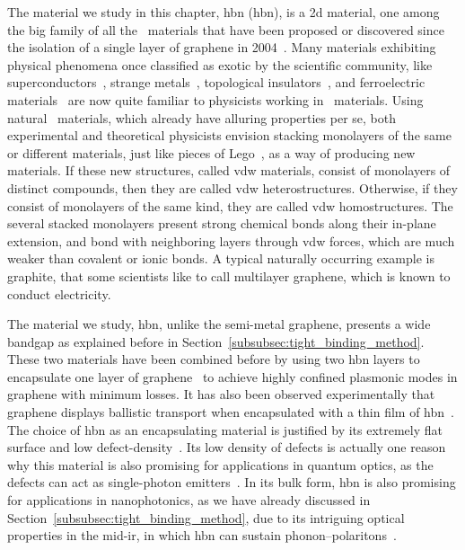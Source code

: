 The material we study in this chapter, \acrlong{hbn} (\gls{hbn}), is a \gls{2d} material, one among the big family of all the \bd~materials that have been proposed or discovered since the isolation of a single layer of graphene in 2004~\cite{Novoselov_Geim_2004}.
Many materials exhibiting physical phenomena once classified as exotic by the scientific community, like superconductors~\cite{Dong_2021}, strange metals~\cite{Li_2024}, topological insulators~\cite{Zhang_Liu_Qi_Dai_Fang_Zhang_2009}, and ferroelectric materials~\cite{Wang_Meng_2023} are now quite familiar to physicists working in \bd~materials.
Using natural \bd~materials, which already have alluring properties per se, both experimental and theoretical physicists envision stacking monolayers of the same or different materials, just like pieces of Lego~\cite{Dielectric_Genome}, as a way of producing new materials.
If these new structures, called \gls{vdw} materials, consist of monolayers of distinct compounds, then they are called \gls{vdw} heterostructures.
Otherwise, if they consist of monolayers of the same kind, they are called \gls{vdw} homostructures.
The several stacked monolayers present strong chemical bonds along their in-plane extension, and bond with neighboring layers through \gls{vdw} forces, which are much weaker than covalent or ionic bonds.
A typical naturally occurring example is graphite, that some scientists like to call multilayer graphene, which is known to conduct electricity.

The material we study, \gls{hbn}, unlike the semi-metal graphene, presents a wide bandgap as explained before in Section~\ref{subsubsec:tight_binding_method}.
These two materials have been combined before by using two \gls{hbn} layers to encapsulate one layer of graphene~\cite{Woessner_2015} to achieve highly confined plasmonic modes in graphene with minimum losses.
It has also been observed experimentally that graphene displays ballistic transport when encapsulated with a thin film of \gls{hbn}~\cite{Banszerus_2016}.
The choice of \gls{hbn} as an encapsulating material is justified by its extremely flat surface and low defect-density~\cite{Abidi_2019}.
Its low density of defects is actually one reason why this material is also promising for applications in quantum optics, as the defects can act as single-photon emitters~\cite{Li_Pershin_2022}.
In its bulk form, \gls{hbn} is also promising for applications in nanophotonics, as we have already discussed in Section~\ref{subsubsec:tight_binding_method}, due to its intriguing optical properties in the mid-\gls{ir}, in which \gls{hbn} can sustain phonon--polaritons~\cite{Rizzo_Zhang_2023}.

